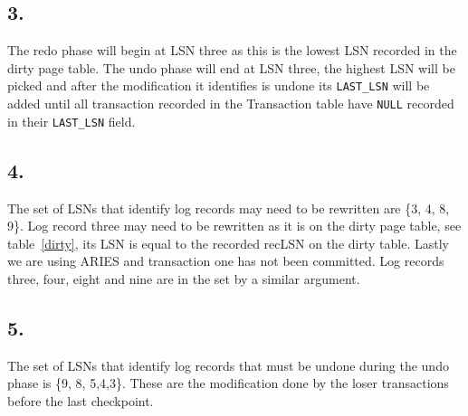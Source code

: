 \documentclass[a4paper]{article}
\begin{document}
\subsection*{3.}
The redo phase will begin at LSN three as this is the lowest LSN recorded in the dirty page table. The undo phase will end at LSN three, the highest LSN will be picked and after the modification it identifies is undone its \texttt{LAST\_LSN} will be added until all transaction recorded in the Transaction table have \texttt{NULL} recorded in their \texttt{LAST\_LSN} field.
\subsection*{4.}
The set of LSNs that identify log records may need to be rewritten are \{3, 4, 8, 9\}. Log record three may need to be rewritten as it is on the dirty page table, see table~\ref{dirty}, its LSN is equal to the recorded recLSN on the dirty table. Lastly we are using ARIES and transaction one has not been committed. Log records three, four, eight and nine are in the set by a similar argument.
\subsection*{5.}
The set of LSNs that identify log records that must be undone during the undo phase is \{9, 8, 5,4,3\}. These are the modification done by the loser transactions before the last checkpoint.
\end{document}
